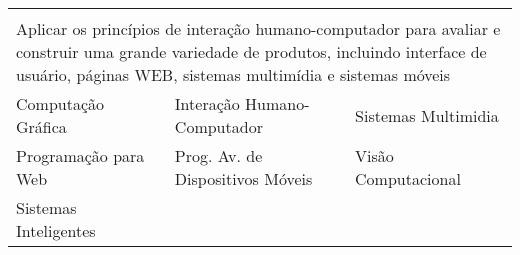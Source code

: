 \begin{longtable}{|p{}p{}p{}|}
    \multicolumn{3}{p{0.95\textwidth}}{}\\
    \multicolumn{3}{p{0.95\textwidth}}{Aplicar os princípios de interação
    humano-computador para avaliar e construir uma grande variedade de
    produtos, incluindo interface de usuário, páginas WEB, sistemas multimídia
    e sistemas móveis}\\
    \hline
    \textcolor{nblue}{Computação Gráfica} & 
    \textcolor{nyellow}{\small Interação Humano-Computador} &
    \textcolor{nyellow}{Sistemas Multimidia}\\
    \textcolor{nyellow}{Programação para Web} &
    \textcolor{nyellow}{\small Prog. Av. de Dispositivos Móveis} & 
    \textcolor{nyellow}{Visão Computacional}\\
    \textcolor{nyellow}{Sistemas Inteligentes} & & \\
    \hline
    
\end{longtable}

